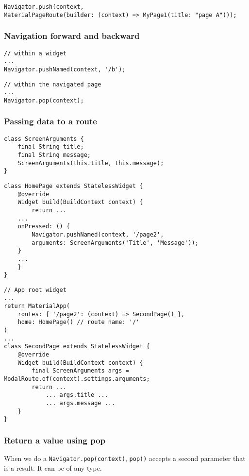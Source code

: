 \begin{lstlisting}
Navigator.push(context, 
MaterialPageRoute(builder: (context) => MyPage1(title: "page A")));
\end{lstlisting}

\subsubsection{Navigation forward and backward}

\begin{lstlisting}[title=Navigate forward]
// within a widget
... 
Navigator.pushNamed(context, '/b');
\end{lstlisting}

\begin{lstlisting}[title=Navigate backward]
// within the navigated page
...
Navigator.pop(context);
\end{lstlisting}

\subsubsection{Passing data to a route}

\begin{lstlisting}[title=Class to be passed]
class ScreenArguments {
    final String title;
    final String message;
    ScreenArguments(this.title, this.message);
} 
\end{lstlisting}

\begin{lstlisting}[title=Class to create page]
class HomePage extends StatelessWidget {
    @override
    Widget build(BuildContext context) {
        return ...
    ...
    onPressed: () {
        Navigator.pushNamed(context, '/page2',
        arguments: ScreenArguments('Title', 'Message'));
    }
    ...
    }
}
\end{lstlisting}

\begin{lstlisting}[title=Page]
// App root widget
...
return MaterialApp(
    routes: { '/page2': (context) => SecondPage() },
    home: HomePage() // route name: '/'
)
...
class SecondPage extends StatelessWidget {
    @override
    Widget build(BuildContext context) {
        final ScreenArguments args = ModalRoute.of(context).settings.arguments;
        return ...
            ... args.title ...
            ... args.message ...
    }
}
\end{lstlisting}

\subsubsection{Return a value using pop}
When we do a \texttt{Navigator.pop(context)}, \texttt{pop()} accepts a second parameter that is a
result. It can be of any type.

